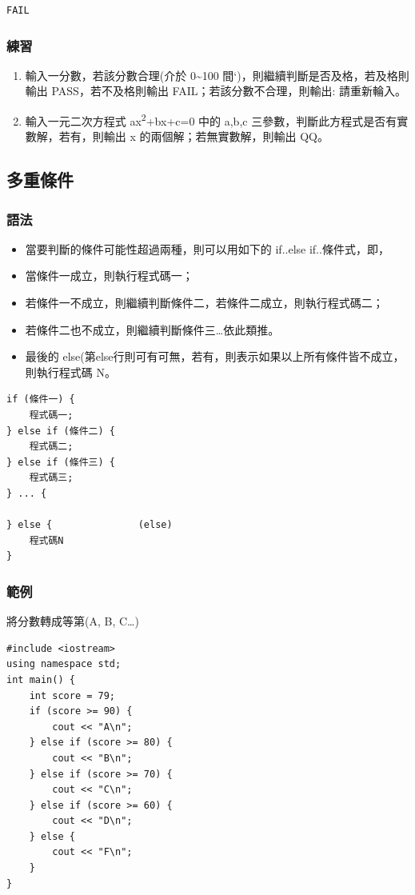 \documentclass[12pt,a4paper]{article}
\begin{document}
\begin{verbatim}
FAIL
\end{verbatim}
\subsubsection{練習}
\label{sec:orga201c97}
\begin{enumerate}
\item 輸入一分數，若該分數合理(介於 0\textasciitilde{}100 間`)，則繼續判斷是否及格，若及格則輸出 PASS，若不及格則輸出 FAIL；若該分數不合理，則輸出: 請重新輪入。
\item 輸入一元二次方程式 ax\textsuperscript{2}+bx+c=0 中的 a,b,c 三參數，判斷此方程式是否有實數解，若有，則輸出 x 的兩個解；若無實數解，則輸出 QQ。
\end{enumerate}
\subsection{多重條件}
\label{cpp_multi_conditions}
\subsubsection{語法}
\label{sec:orgdad6d83}
\begin{itemize}
\item 當要判斷的條件可能性超過兩種，則可以用如下的 if..else if..條件式，即，
\item 當條件一成立，則執行程式碼一；
\item 若條件一不成立，則繼續判斷條件二，若條件二成立，則執行程式碼二；
\item 若條件二也不成立，則繼續判斷條件三\ldots{}依此類推。
\item 最後的 else(第else行則可有可無，若有，則表示如果以上所有條件皆不成立，則執行程式碼 N。
\end{itemize}
\lstset{breaklines=true,language=cpp,label= ,caption= ,captionpos=b,numbers=none}
\begin{lstlisting}
if (條件一) {
    程式碼一;
} else if (條件二) {
    程式碼二;
} else if (條件三) {
    程式碼三;
} ... {

} else {               (else)
    程式碼N
}
\end{lstlisting}

\subsubsection{範例}
\label{sec:org256d859}
將分數轉成等第(A, B, C\ldots{})
\lstset{breaklines=true,language=cpp,label= ,caption= ,captionpos=b,firstnumber=1,numbers=left}
\begin{lstlisting}
#include <iostream>
using namespace std;
int main() {
    int score = 79;
    if (score >= 90) {
        cout << "A\n";
    } else if (score >= 80) {
        cout << "B\n";
    } else if (score >= 70) {
        cout << "C\n";
    } else if (score >= 60) {
        cout << "D\n";
    } else {
        cout << "F\n";
    }
}
\end{lstlisting}
\end{document}
